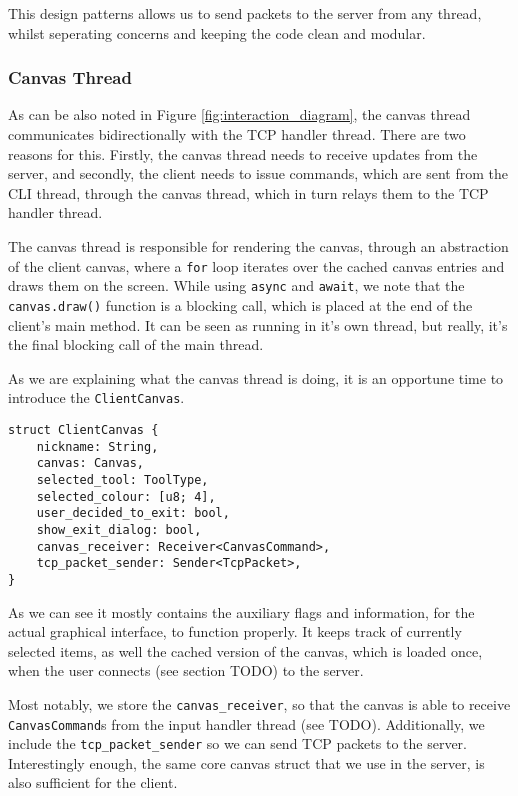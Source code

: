 \documentclass{article}
\newcommand{\code}[1]{\texttt{#1}}
\begin{document}
This design patterns allows us to send packets to the server from any thread,
whilst seperating concerns and keeping the code clean and modular.

\subsubsection{Canvas Thread}

As can be also noted in Figure \ref{fig:interaction_diagram}, the canvas thread
communicates bidirectionally with the TCP handler thread. There are two reasons
for this. Firstly, the canvas thread needs to receive updates from the server,
and secondly, the client needs to issue commands, which are sent from the CLI
thread, through the canvas thread, which in turn relays them to the TCP handler
thread.

The canvas thread is responsible for rendering the canvas, through an
abstraction of the client canvas, where a \code{for} loop iterates over the
cached canvas entries and draws them on the screen. While using \code{async} and
\code{await}, we note that the \code{canvas.draw()} function is a blocking call,
which is placed at the end of the client's main method. It can be seen as
running in it's own thread, but really, it's the final blocking call of the main
thread.

As we are explaining what the canvas thread is doing, it is an opportune time to introduce the \code{ClientCanvas}.

\begin{subbox}{}
    \lstset{xleftmargin=0\textwidth, xrightmargin=0\textwidth}
    \begin{lstlisting}
struct ClientCanvas {
    nickname: String,
    canvas: Canvas,
    selected_tool: ToolType,
    selected_colour: [u8; 4],
    user_decided_to_exit: bool,
    show_exit_dialog: bool,
    canvas_receiver: Receiver<CanvasCommand>,
    tcp_packet_sender: Sender<TcpPacket>,
}
    \end{lstlisting}
\end{subbox}

As we can see it mostly contains the auxiliary flags and information, for the
actual graphical interface, to function properly. It keeps track of currently
selected items, as well the cached version of the canvas, which is loaded once,
when the user connects (see section TODO) to the server.

Most notably, we store the \code{canvas\_receiver}, so that the canvas is able
to receive \code{CanvasCommand}s from the input handler thread (see TODO).
Additionally, we include the \code{tcp\_packet\_sender} so we can send TCP
packets to the server. Interestingly enough, the same core canvas struct that we
use in the server, is also sufficient for the client.
\end{document}
